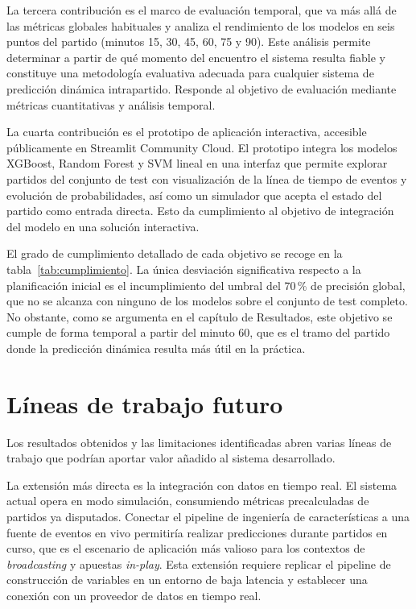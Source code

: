 La tercera contribución es el marco de evaluación temporal, que va más allá de las métricas globales habituales y analiza el rendimiento de los modelos en seis puntos del partido (minutos 15, 30, 45, 60, 75 y 90). Este análisis permite determinar a partir de qué momento del encuentro el sistema resulta fiable y constituye una metodología evaluativa adecuada para cualquier sistema de predicción dinámica intrapartido. Responde al objetivo de evaluación mediante métricas cuantitativas y análisis temporal.

La cuarta contribución es el prototipo de aplicación interactiva, accesible públicamente en Streamlit Community Cloud. El prototipo integra los modelos XGBoost, Random Forest y SVM lineal en una interfaz que permite explorar partidos del conjunto de test con visualización de la línea de tiempo de eventos y evolución de probabilidades, así como un simulador que acepta el estado del partido como entrada directa. Esto da cumplimiento al objetivo de integración del modelo en una solución interactiva.

El grado de cumplimiento detallado de cada objetivo se recoge en la tabla~\ref{tab:cumplimiento}. La única desviación significativa respecto a la planificación inicial es el incumplimiento del umbral del 70\,\% de precisión global, que no se alcanza con ninguno de los modelos sobre el conjunto de test completo. No obstante, como se argumenta en el capítulo de Resultados, este objetivo se cumple de forma temporal a partir del minuto 60, que es el tramo del partido donde la predicción dinámica resulta más útil en la práctica.

\section{Líneas de trabajo futuro}

Los resultados obtenidos y las limitaciones identificadas abren varias líneas de trabajo que podrían aportar valor añadido al sistema desarrollado.

La extensión más directa es la integración con datos en tiempo real. El sistema actual opera en modo simulación, consumiendo métricas precalculadas de partidos ya disputados. Conectar el pipeline de ingeniería de características a una fuente de eventos en vivo permitiría realizar predicciones durante partidos en curso, que es el escenario de aplicación más valioso para los contextos de \textit{broadcasting} y apuestas \textit{in-play}. Esta extensión requiere replicar el pipeline de construcción de variables en un entorno de baja latencia y establecer una conexión con un proveedor de datos en tiempo real.

